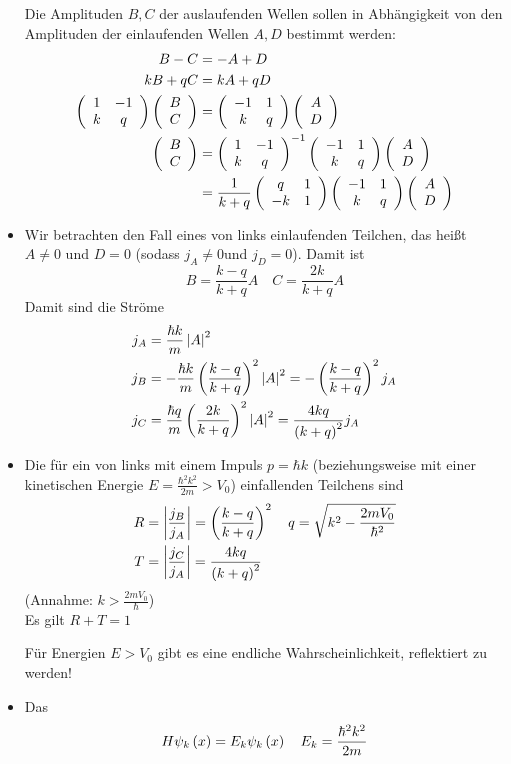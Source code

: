 \begin{itemize}
  Die Amplituden $B,C$ der auslaufenden Wellen sollen in Abhängigkeit von den Amplituden der einlaufenden Wellen $A,D$ bestimmt werden:
  \begin{align}
    B - C & = - A + D \\
    k B + q C & = k A + q D \\
    \left(\begin{array}{c c} 1 & -1 \\ k & q \end{array}\right) \left(\begin{array}{c}B \\ C\end{array}\right) & = \left(\begin{array}{c c} -1 & 1 \\ k & q \end{array}\right) \left(\begin{array}{c}A \\ D\end{array}\right) \\
    \left(\begin{array}{c}B \\ C\end{array}\right) & = \left(\begin{array}{c c} 1 & -1 \\ k & q \end{array}\right)^{-1}\left(\begin{array}{c c} -1 & 1 \\ k & q \end{array}\right)\left(\begin{array}{c}A \\ D\end{array}\right) \\
    & = \frac{1}{k+q} \left(\begin{array}{c c} q & 1 \\ -k & 1 \end{array}\right)\left(\begin{array}{c c} -1 & 1 \\ k & q \end{array}\right)\left(\begin{array}{c}A \\ D\end{array}\right)
  \end{align}
  \item Wir betrachten den Fall eines von links einlaufenden Teilchen, das heißt $A\neq 0$ und $D = 0$ (sodass $j_A \neq 0$und $j_D = 0$). Damit ist
  \begin{equation}
    B = \frac{k-q}{k+q} A \quad C = \frac{2k}{k+q} A
  \end{equation}
  Damit sind die Ströme
  \begin{align}
    j_A & = \frac{\hbar k}{m} \left\lvert A \right\rvert^2 \\
    j_B & = -\frac{\hbar k}{m}\left(\frac{k-q}{k+q}\right)^2\left\lvert A \right\rvert^2 = - \left(\frac{k-q}{k+q}\right)^2 j_A \\
    j_C & = \frac{\hbar q}{m}\left(\frac{2k}{k+q}\right)^2 \left\lvert A \right\rvert^2 = \frac{4kq}{\left(k+q\right)^2} j_A
  \end{align}
  \item Die  für ein von links mit einem Impuls $p = \hbar k$ (beziehungsweise mit einer kinetischen Energie $E = \frac{\hbar^2 k^2}{2m} > V_0$) einfallenden Teilchens sind
  \begin{align}
    R & = \left\lvert \frac{j_B}{j_A} \right\rvert = \left(\frac{k-q}{k+q}\right)^2 \quad q = \sqrt{k^2 - \frac{2mV_0}{\hbar^2}} \\
    T & = \left\lvert \frac{j_C}{j_A} \right\rvert = \frac{4kq}{\left(k+q\right)^2}
  \end{align}
  (Annahme: $k > \frac{2mV_0}{\hbar}$)\\
  Es gilt $R+ T = 1$
  \begin{figure}[H]
    \centering
    
  \end{figure}
  Für Energien $E > V_0$ gibt es eine endliche Wahrscheinlichkeit, reflektiert zu werden!
  \item Das 
  \begin{equation}
    H\psi_k\of{x} = E_k \psi_k\of{x} \quad E_k = \frac{\hbar^2 k^2}{2 m}

\end{equation}
\end{itemize}
